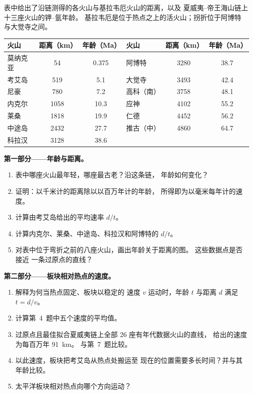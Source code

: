 \begin{problem}
\label{pb:g11:plate-motions:1}
表中给出了沿链测得的各火山与基拉韦厄火山的距离，以及
夏威夷–帝王海山链上十三座火山的钾–氩年龄。
基拉韦厄是位于热点之上的活火山；拐折位于阿博特
与大觉寺之间。

\begin{center}
\small
\begin{tabular}{|l|c|c||l|c|c|}
\hline
火山 & 距离（\unit{km}） & 年龄（\unit{Ma}） & 火山 & 距离（\unit{km}） & 年龄（\unit{Ma}） \\ \hline
莫纳克亚 & 54 & 0.375 & 阿博特 & 3280 & 38.7 \\ \hline
考艾岛 & 519 & 5.1 & 大觉寺 & 3493 & 42.4 \\ \hline
尼豪 & 780 & 7.2 & 高科（南） & 3758 & 48.1 \\ \hline
内克尔 & 1058 & 10.3 & 应神 & 4102 & 55.2 \\ \hline
莱桑 & 1818 & 19.9 & 仁德 & 4452 & 56.2 \\ \hline
中途岛 & 2432 & 27.7 & 推古（中） & 4860 & 64.7 \\ \hline
科拉汉 & 3128 & 38.6 & & & \\ \hline
\end{tabular}
\end{center}

\medskip
\noindent\textbf{第一部分——年龄与距离。}
\begin{enumerate}
  \item 表中哪座火山最年轻，哪座最古老？沿这条链，
        年龄如何变化？
  \item 证明：以千米计的距离除以以百万年计的年龄，
        所得即为以毫米每年计的速度。
  \item 计算由考艾岛给出的平均速率 $d/t$。
  \item 计算内克尔、莱桑、中途岛、科拉汉和阿博特的 $d/t$。
  \item 对表中位于弯折之前的八座火山，画出年龄关于距离的图。
        这些数据点是否接近
        一条过原点的直线？
\end{enumerate}

\medskip
\noindent\textbf{第二部分——板块相对热点的速度。}
\begin{enumerate}[resume]
  \item 解释为何当热点固定、板块以稳定的
        速度 $v$ 运动时，年龄 $t$ 与距离 $d$ 满足 $t = d/v$。
  \item 计算第~4~题中五个速度的平均值。
  \item 过原点且最佳拟合夏威夷链上全部 26 座有年代数据火山的直线，
        给出的速度为每百万年 \qty{91}{km}。
        与第~7~题比较。
  \item 以此速度，板块把考艾岛从热点处搬运至
        现在的位置需要多长时间？并与其年龄比较。
  \item 太平洋板块相对热点向哪个方向运动？
\end{enumerate}


\end{problem}
